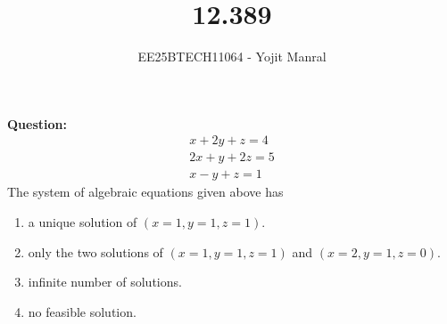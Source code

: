 \documentclass[journal]{IEEEtran}
\begin{document}

\vspace{3cm}

\title{12.389}
\author{EE25BTECH11064 - Yojit Manral}

\maketitle
{\let\newpage\relax\maketitle}
\renewcommand{\thefigure}{\theenumi}
\renewcommand{\thetable}{\theenumi}
\setlength{\intextsep}{10pt} %

\textbf{Question:}\\
\begin{align*}
    x + 2y + z = 4 \\
    2x + y + 2z = 5 \\
    x - y + z = 1
\end{align*}
The system of algebraic equations given above has
\begin{enumerate}[label=(\alph*)]
    \item a unique solution of $(x = 1, y = 1, z = 1)$.
    \item only the two solutions of $(x = 1, y = 1, z = 1)$ and $(x = 2, y = 1, z = 0)$.
    \item infinite number of solutions.
    \item no feasible solution.
\end{enumerate}
\end{document}
